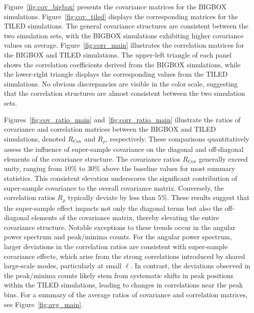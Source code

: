 Figure~\ref{fig:cov_bigbox} presents the covariance matrices for the BIGBOX simulations. Figure~\ref{fig:cov_tiled} displays the corresponding matrices for the TILED simulations. The general covariance structures are consistent between the two simulation sets, with the BIGBOX simulations exhibiting higher covariance values on average. Figure~\ref{fig:corr_main} illustrates the correlation matrices for the BIGBOX and TILED simulations. The upper-left triangle of each panel shows the correlation coefficients derived from the BIGBOX simulations, while the lower-right triangle displays the corresponding values from the TILED simulations. No obvious discrepancies are visible in the color scale, suggesting that the correlation structures are almost consistent between the two simulation sets.

Figures~\ref{fig:cov_ratio_main} and~\ref{fig:corr_ratio_main} illustrate the ratios of covariance and correlation matrices between the BIGBOX and TILED simulations, denoted $R_{\text{Cov}}$ and $R_{\rho}$, respectively. These comparisons quantitatively assess the influence of super-sample covariance on the diagonal and off-diagonal elements of the covariance structure. The covariance ratios $R_{\text{Cov}}$ generally exceed unity, ranging from $10\%$ to $30\%$ above the baseline values for most summary statistics. This consistent elevation underscores the significant contribution of super-sample covariance to the overall covariance matrix. Conversely, the correlation ratios $R_{\rho}$ typically deviate by less than $5\%$. These results suggest that the super-sample effect impacts not only the diagonal terms but also the off-diagonal elements of the covariance matrix, thereby elevating the entire covariance structure. Notable exceptions to these trends occur in the angular power spectrum and peak/minima counts. For the angular power spectrum, larger deviations in the correlation ratios are consistent with super-sample covariance effects, which arise from the strong correlations introduced by shared large-scale modes, particularly at small $\ell$. In contrast, the deviations observed in the peak/minima counts likely stem from systematic shifts in peak positions within the TILED simulations, leading to changes in correlations near the peak bins. For a summary of the average ratios of covariance and correlation matrices, see Figure~\ref{fig:avg_main}.

